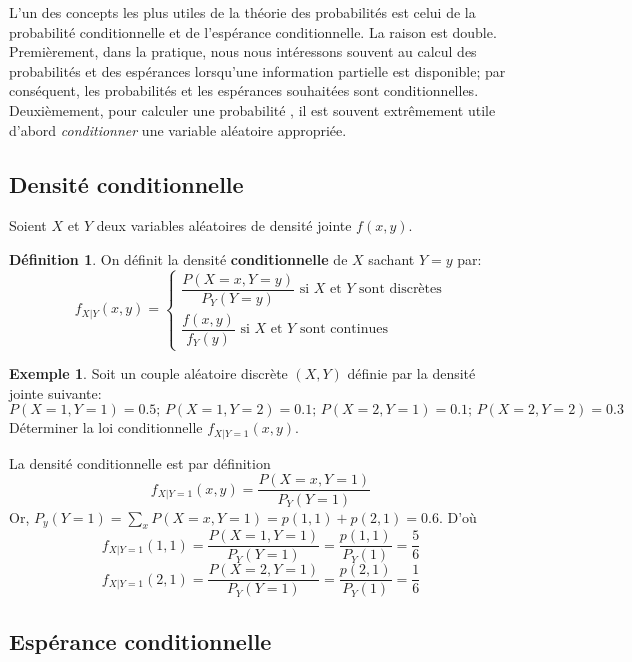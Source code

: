 \documentclass[
]{book}
\theoremstyle{definition}
\newtheorem{definition}{Définition}[chapter]
\theoremstyle{definition}
\newtheorem{example}{Exemple}[chapter]
\theoremstyle{definition}
\theoremstyle{remark}
\begin{document}
L'un des concepts les plus utiles de la théorie des probabilités est celui de la probabilité conditionnelle et de l'espérance conditionnelle. La raison est double. Premièrement, dans la pratique, nous nous intéressons souvent au calcul des probabilités et des espérances lorsqu'une information partielle est
disponible; par conséquent, les probabilités et les espérances souhaitées sont conditionnelles. Deuxièmement, pour calculer une probabilité , il est souvent extrêmement utile d'abord \emph{conditionner} une variable aléatoire appropriée.

\hypertarget{densituxe9-conditionnelle}{%
\subsection{Densité conditionnelle}\label{densituxe9-conditionnelle}}

Soient \(X\) et \(Y\) deux variables aléatoires de densité jointe \(f(x,y)\).

\begin{definition}
\protect\hypertarget{def:unnamed-chunk-21}{}{\label{def:unnamed-chunk-21} }On définit la densité \textbf{conditionnelle} de \(X\) sachant \(Y=y\) par:
\[
  f_{X|Y}(x,y)=\begin{cases}
\dfrac{P(X=x,Y=y)}{P_Y(Y=y)} \text{ si } X \text{ et } Y \text{ sont discrètes}\\
\dfrac{f(x,y)}{f_Y(y)}\text{ si } X \text{ et } Y \text{ sont continues}
\end{cases}
\]
\end{definition}

\begin{example}
\protect\hypertarget{exm:unnamed-chunk-22}{}{\label{exm:unnamed-chunk-22} }Soit un couple aléatoire discrète \((X,Y)\) définie par la densité jointe suivante:
\[
  P(X=1,Y=1)=0.5;\,P(X=1,Y=2)=0.1;\,P(X=2,Y=1)=0.1;\,P(X=2,Y=2)=0.3
  \]
Déterminer la loi conditionnelle \(f_{X|Y=1}(x,y)\).
\end{example}

La densité conditionnelle est par définition
\[
{f}_{X|Y=1}(x,y)=\dfrac{P(X=x,Y=1)}{{P}_Y(Y=1)}
\]
Or, \(P_y(Y=1)=\displaystyle \sum_x P(X=x,Y=1)=p(1,1)+p(2,1)=0.6\).
D'où
\[
{f}_{X|Y=1}(1,1)=\dfrac{P(X=1,Y=1)}{{P}_Y(Y=1)}=\dfrac{p(1,1)}{{P}_Y(1)}=\dfrac{5}{6}
\]
\[
{f}_{X|Y=1}(2,1)=\dfrac{P(X=2,Y=1)}{{P}_Y(Y=1)}=\dfrac{p(2,1)}{{P}_Y(1)}=\dfrac{1}{6}
\]

\hypertarget{espuxe9rance-conditionnelle}{%
\subsection{Espérance conditionnelle}\label{espuxe9rance-conditionnelle}}
\end{document}
